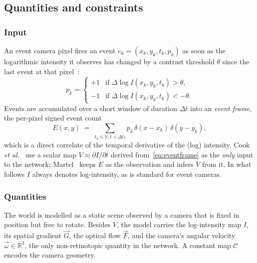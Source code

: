 \documentclass[journal]{IEEEtran}
\newcommand{\Imap}{I}
\newcommand{\Vmap}{V}
\newcommand{\Gmap}{\vec{G}}
\newcommand{\Fmap}{\vec{F}}
\newcommand{\Cmat}{\mathcal{C}}
\newcommand{\wvec}{\vec{\omega}}
\begin{document}
\subsection{Quantities and constraints}
\label{sec:model}

\subsubsection{Input}
An event camera pixel fires an event $e_k=(x_k,y_k,t_k,p_k)$ as soon as the
logarithmic intensity it observes has changed by a contrast threshold $\theta$
since the last event at that pixel~\cite{lichtsteiner2008}:
\begin{equation}
p_k = \begin{cases}
+1 & \text{if } \Delta \log \Imap(x_k,y_k,t_k) > \theta,\\
-1 & \text{if } \Delta \log \Imap(x_k,y_k,t_k) < -\theta .
\end{cases}
\end{equation}
Events are accumulated over a short window of duration $\Delta t$ into an
\emph{event frame}, the per-pixel signed event count
\begin{equation}
E(x,y) \;=\; \sum_{t_k \in [t, t+\Delta t)} p_k \, \delta(x-x_k)\,\delta(y-y_k),
\label{eq:eventframe}
\end{equation}
which is a direct correlate of the temporal derivative of the (log) intensity.
Cook \emph{et al.}~\cite{cook2011} use a scalar map $\Vmap \approx \partial \Imap/\partial t$
derived from~\eqref{eq:eventframe} as the \emph{only} input to the network;
Martel~\cite{martel2015relational,martel2019thesis} keeps $E$ as the observation and infers $\Vmap$ from it. In
what follows $\Imap$ always denotes log-intensity, as is standard for event
cameras.

\subsubsection{Quantities}
The world is modelled as a static scene observed by a camera that is fixed in
position but free to rotate. Besides $\Vmap$, the model carries the
log-intensity map $\Imap$, its spatial gradient $\Gmap$, the optical flow
$\Fmap$, and the camera's angular velocity $\wvec\in\mathbb{R}^3$, the only
non-retinotopic quantity in the network. A constant map $\Cmat$ encodes the
camera geometry.
\end{document}
